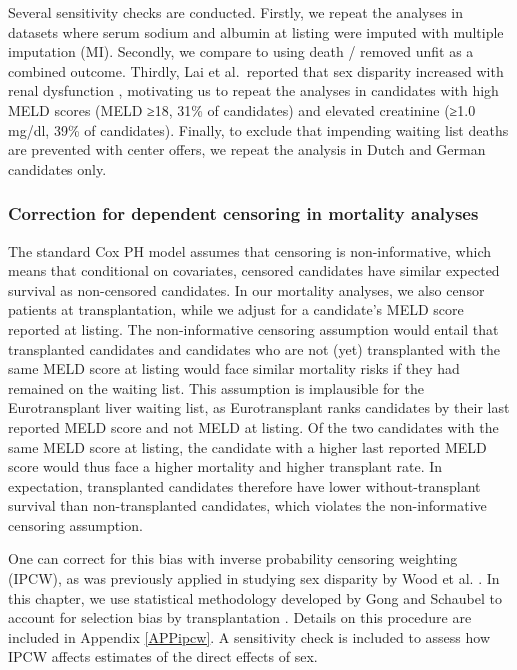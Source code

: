 \documentclass[11pt,twoside,]{book}
\begin{document}
Several sensitivity checks are conducted. Firstly, we repeat the analyses in datasets
where serum sodium and albumin at listing were imputed with multiple imputation (MI).
Secondly, we compare to using death / removed unfit as a combined outcome.
Thirdly, Lai et al.~reported that sex
disparity increased with renal dysfunction \citep{laiHeightContributesGender2010},
motivating us to repeat the analyses
in candidates with high MELD scores (MELD ≥18, 31\% of candidates) and
elevated creatinine (≥1.0 mg/dl, 39\% of candidates). Finally, to exclude
that impending waiting list deaths are prevented with center offers,
we repeat the analysis in Dutch and German candidates only.

\subsubsection{Correction for dependent censoring in mortality analyses}\label{correction-for-dependent-censoring-in-mortality-analyses}

The standard Cox PH model assumes that censoring is non-informative, which means
that conditional on covariates, censored candidates have similar expected
survival as non-censored candidates. In our mortality analyses, we also censor
patients at transplantation, while we adjust for a candidate's MELD score reported
at listing. The non-informative censoring assumption would entail that
transplanted candidates and candidates who are not (yet) transplanted
with the same MELD score at listing would face
similar mortality risks if they had remained on the waiting list.
\newpage
This assumption is implausible for the Eurotransplant liver waiting list, as
Eurotransplant ranks candidates by their last reported MELD score and
not MELD at listing. Of the two candidates with the same
MELD score at listing, the candidate with a higher last reported MELD score would
thus face a higher mortality and higher transplant rate. In expectation,
transplanted candidates therefore have lower without-transplant survival than
non-transplanted candidates, which violates the non-informative censoring
assumption.

One can correct for this bias with inverse probability censoring weighting (IPCW),
as was previously applied in studying sex disparity by Wood et al. \citep{woodCorrectingSexDisparity2021}. In this chapter, we use statistical methodology
developed by Gong and Schaubel to account for selection bias by transplantation \citep{gongEstimatingAverageTreatment2017}. Details on this procedure are included
in Appendix \ref{APPipcw}. A sensitivity check is included to assess how IPCW
affects estimates of the direct effects of sex.
\end{document}
